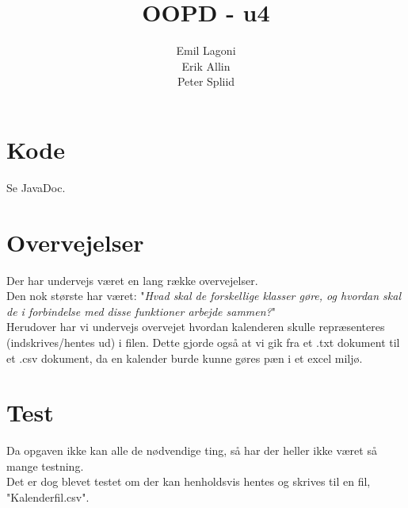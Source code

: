 \documentclass[a4paper,11pt]{article}
\title{\textbf{OOPD - u4}}
\author{Emil Lagoni\\Erik Allin\\Peter Spliid}
\begin{document}
\maketitle
\section*{Kode}
Se JavaDoc.


\section*{Overvejelser}
Der har undervejs været en lang række overvejelser. \\
Den nok største har været: "\textit{Hvad skal de forskellige klasser gøre, og hvordan skal de i forbindelse med disse funktioner arbejde sammen?}" \\
Herudover har vi undervejs overvejet hvordan kalenderen skulle repræsenteres (indskrives/hentes ud) i filen. Dette gjorde også at vi gik fra et .txt dokument til et .csv dokument, da en kalender burde kunne gøres pæn i et excel miljø.

\section*{Test}
Da opgaven ikke kan alle de nødvendige ting, så har der heller ikke været så mange testning. \\
Det er dog blevet testet om der kan henholdsvis hentes og skrives til en fil, "Kalenderfil.csv".
\end{document}

